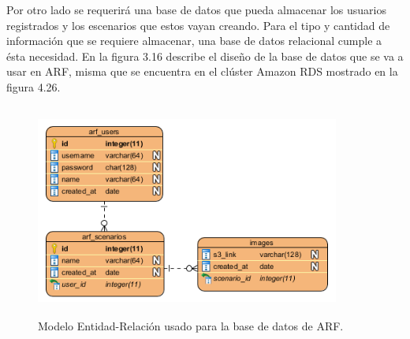 \par
Por otro lado se requerirá una base de datos que pueda almacenar los usuarios registrados y los escenarios que estos vayan creando. Para el tipo y cantidad de información que se requiere almacenar, una base de datos relacional cumple a ésta necesidad. En la figura  3.16 describe el diseño de la base de datos que se va a usar en ARF, misma que se encuentra en el clúster Amazon RDS mostrado en la figura 4.26.
\begin{figure}[H]
	\centering
	\includegraphics[width=10cm,height=7cm]{imagenes/desarrollo/arquitectura/ERD.png}
	\caption{Modelo Entidad-Relación usado para la base de datos de ARF.}
	\label{fig:arqbackend}
\end{figure}




